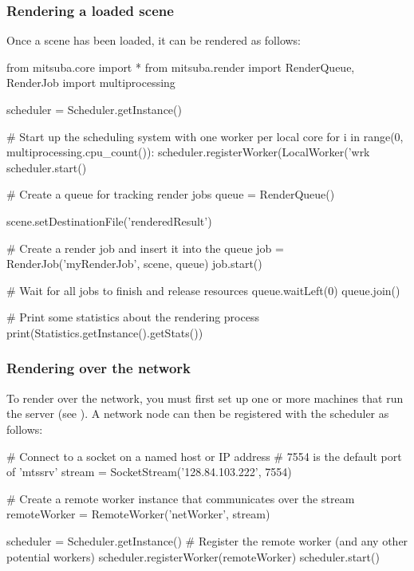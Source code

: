 \subsubsection{Rendering a loaded scene}
Once a scene has been loaded, it can be rendered as follows:
\begin{python}
from mitsuba.core import *
from mitsuba.render import RenderQueue, RenderJob
import multiprocessing

scheduler = Scheduler.getInstance()

# Start up the scheduling system with one worker per local core
for i in range(0, multiprocessing.cpu_count()):
	scheduler.registerWorker(LocalWorker('wrk%
scheduler.start()

# Create a queue for tracking render jobs
queue = RenderQueue()

scene.setDestinationFile('renderedResult')

# Create a render job and insert it into the queue
job = RenderJob('myRenderJob', scene, queue)
job.start()

# Wait for all jobs to finish and release resources
queue.waitLeft(0)
queue.join()

# Print some statistics about the rendering process
print(Statistics.getInstance().getStats())
\end{python}

\subsubsection{Rendering over the network}
To render over the network, you must first set up one or
more machines that run the  server (see ).
A network node can then be registered with the scheduler as follows:
\begin{python}
# Connect to a socket on a named host or IP address
# 7554 is the default port of 'mtssrv'
stream = SocketStream('128.84.103.222', 7554)

# Create a remote worker instance that communicates over the stream
remoteWorker = RemoteWorker('netWorker', stream)

scheduler = Scheduler.getInstance()
# Register the remote worker (and any other potential workers)
scheduler.registerWorker(remoteWorker)
scheduler.start()
\end{python}

